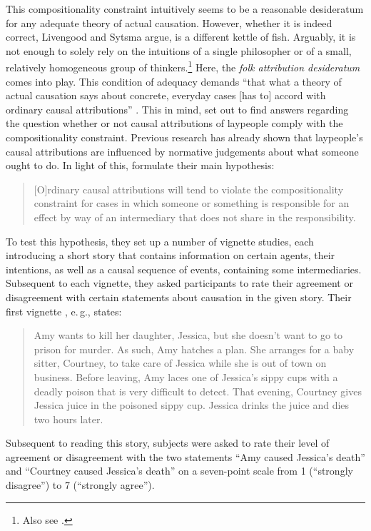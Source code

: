 \documentclass[12pt]{scrartcl}
\begin{document}
This compositionality constraint intuitively seems to be a reasonable desideratum for any adequate theory of actual causation. However, whether it is indeed correct, Livengood and Sytsma argue, is a different kettle of fish. Arguably, it is not enough to solely rely on the intuitions of a single philosopher or of a small, relatively homogeneous group of thinkers.\footnote{Also see \cite{bauer_two_2020}.} Here, the \textit{folk attribution desideratum} \citep{livengood_following_2017} comes into play. This condition of adequacy demands \enquote{that what a theory of actual causation says about concrete, everyday cases [has to] accord with ordinary causal attributions} \citep[48]{livengood_actual_2020}. This in mind, \citeauthor*{livengood_actual_2020} set out to find answers regarding the question whether or not causal attributions of laypeople comply with the compositionality constraint. Previous research has already shown that laypeople's causal attributions are influenced by normative judgements about what someone ought to do. In light of this, \citet*[48]{livengood_actual_2020} formulate their main hypothesis:
%
\begin{quote}
   \small [O]rdinary causal attributions will tend to violate the compositionality constraint for cases in which someone or something is responsible for an effect by way of an intermediary that does not share in the responsibility.
\end{quote}
%
To test this hypothesis, they set up a number of vignette studies, each introducing a short story that contains information on certain agents, their intentions, as well as a causal sequence of events, containing some intermediaries. Subsequent to each vignette, they asked participants to rate their agreement or disagreement with certain statements about causation in the given story. Their first vignette \citep[49]{livengood_actual_2020}, e.\,g., states:
%
\begin{quote}
   \small Amy wants to kill her daughter, Jessica, but she doesn't want to go to prison for murder. As such, Amy hatches a plan. She arranges for a baby sitter, Courtney, to take care of Jessica while she is out of town on business. Before leaving, Amy laces one of Jessica's sippy cups with a deadly poison that is very difficult to detect. That evening, Courtney gives Jessica juice in the poisoned sippy cup. Jessica drinks the juice and dies two hours later.
\end{quote}
%
Subsequent to reading this story, subjects were asked to rate their level of agreement or disagreement with the two statements \enquote{Amy caused Jessica's death} and \enquote{Courtney caused Jessica's death} on a seven-point scale from 1 (\enquote{strongly disagree}) to 7 (\enquote{strongly agree}).
\end{document}
